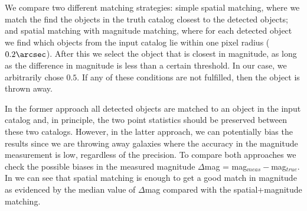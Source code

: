 \documentclass[\docopts]{\docclass}
\begin{document}
We compare two different matching strategies: simple spatial matching, where we match the find the objects in the truth catalog closest to the detected objects; and spatial matching with magnitude matching, where for each detected object we find which objects from the input catalog lie within one pixel radius ($0.2 \arcsec$). After this we select the object that is closest in magnitude, as long as the difference in magnitude is less than a certain threshold. In our case, we arbitrarily chose $0.5$. If any of these conditions are not fulfilled, then the object is thrown away.

In the former approach all detected objects are matched to an object in the input catalog and, in principle, the two point statistics should be preserved between these two catalogs. However, in the latter approach, we can potentially bias the results since we are throwing away galaxies where the accuracy in the magnitude measurement is low, regardless of the precision. To compare both approaches we check the possible biases in the measured magnitude $\Delta$mag = mag$_{meas} - $mag$_{true}$. In  we can see that spatial matching is enough to get a good match in magnitude as evidenced by the median value of $\Delta$mag compared with the spatial+magnitude matching.
\end{document}

